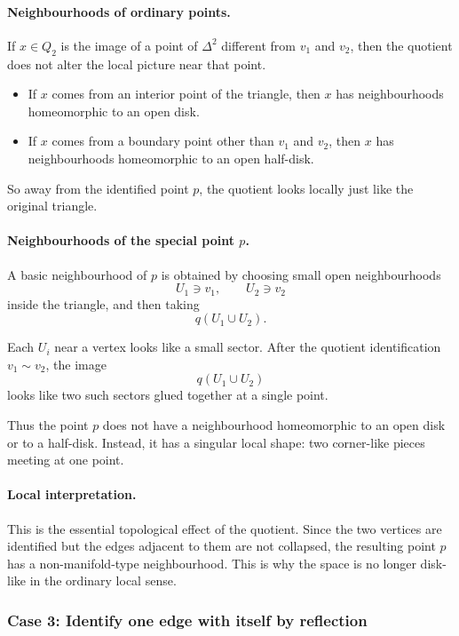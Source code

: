 \documentclass[12pt,a4paper]{article}
\theoremstyle{notespace}
\begin{document}
\paragraph{Neighbourhoods of ordinary points.}
If \(x\in Q_2\) is the image of a point of \(\Delta^2\) different from \(v_1\) and \(v_2\), then the quotient does not alter the local picture near that point.

\begin{itemize}
	\item If \(x\) comes from an interior point of the triangle, then \(x\) has neighbourhoods homeomorphic to an open disk.
	\item If \(x\) comes from a boundary point other than \(v_1\) and \(v_2\), then \(x\) has neighbourhoods homeomorphic to an open half-disk.
\end{itemize}

So away from the identified point \(p\), the quotient looks locally just like the original triangle.

\paragraph{Neighbourhoods of the special point \(p\).}
A basic neighbourhood of \(p\) is obtained by choosing small open neighbourhoods
\[
U_1\ni v_1,
\qquad
U_2\ni v_2
\]
inside the triangle, and then taking
\[
q(U_1\cup U_2).
\]

Each \(U_i\) near a vertex looks like a small sector. After the quotient identification \(v_1\sim v_2\), the image
\[
q(U_1\cup U_2)
\]
looks like two such sectors glued together at a single point.

Thus the point \(p\) does not have a neighbourhood homeomorphic to an open disk or to a half-disk. Instead, it has a singular local shape: two corner-like pieces meeting at one point.

\paragraph{Local interpretation.}
This is the essential topological effect of the quotient. Since the two vertices are identified but the edges adjacent to them are not collapsed, the resulting point \(p\) has a non-manifold-type neighbourhood. This is why the space is no longer disk-like in the ordinary local sense.

\subsubsection{Case 3: Identify one edge with itself by reflection}
\end{document}
